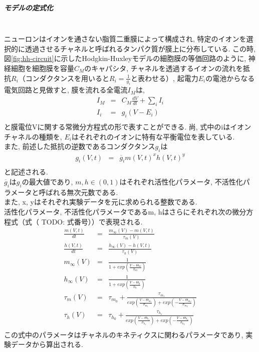 \subparagraph{モデルの定式化}~\\
\label{subpar-hh-model}
ニューロンはイオンを通さない脂質二重膜によって構成され, 特定のイオンを選択的に透過させるチャネルと呼ばれるタンパク質が膜上に分布している.
この時, 図\ref{fig:hh-circuit}に示したHodgkin-Huxleyモデルの細胞膜の等価回路のように,
神経細胞を細胞膜を容量$C_M$のキャパシタ, チャネルを透過するイオンの流れを抵抗$R_i$（コンダクタンスを用いると$R_i = \frac{1}{g_i}$と表わせる）, 起電力$E_i$の電池からなる電気回路と見做すと, 膜を流れる全電流$I_M$は,
\begin{eqnarray}
  I_M & = & C_M\frac{dV}{dt} + \sum_{i} I_i\\
  I_i & = & g_i (V - E_i)\\
\end{eqnarray}
と膜電位Vに関する常微分方程式の形で表すことができる. 尚, 式中のiはイオンチャネルの種類を, $E_i$はそれぞれのイオンに特有な平衡電位を表している.\\
また, 前述した抵抗の逆数であるコンダクタンス$g_i$は
\begin{eqnarray}
  g_i(V, t) & = &\overline{g}_im(V, t)^xh(V,t)^y\\
\end{eqnarray}
と記述される.\\
$\overline{g}_i$は$g_i$の最大値であり, $m, h \in (0, 1)$はそれぞれ活性化パラメータ, 不活性化パラメータと呼ばれる無次元数である.\\
また, x, yはそれぞれ実験データを元に求められる整数である.\\
活性化パラメータ, 不活性化パラメータであるm, hはさらにそれぞれ次の微分方程式（式（ TODO: 式番号））で表現される.\\
\begin{eqnarray}
  \frac{m(V,t)}{dt} & = &\frac{m_\infty(V) - m(V, t)}{\tau_m(V)}\\
  \frac{h(V,t)}{dt} & = &\frac{h_\infty(V) - h(V, t)}{\tau_h(V)}\\
  m_\infty(V) & = & \frac{1}{1 + exp(\frac{V - \Theta_m}{k_m})}\\
  h_\infty(V) & = & \frac{1}{1 + exp(\frac{V - \Theta_h}{k_h})}\\
  \tau_m(V) & = & \tau_{m_0} + \frac{\tau_{m_1}}{exp(\frac{V - \Theta_{m_1}}{\sigma_{m_1}}) + exp(-\frac{V - \Theta_{m_2}}{\sigma_{m_2}})}\\
  \tau_h(V) & = & \tau_{h_0} + \frac{\tau_{h_1}}{exp(\frac{V - \Theta_{h_1}}{\sigma_{h_1}}) + exp(-\frac{V - \Theta_{h_2}}{\sigma_{h_2}})}\\
\end{eqnarray}
この式中のパラメータはチャネルのキネティクスに関わるパラメータであり, 実験データから算出される.\\

